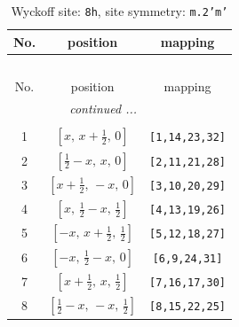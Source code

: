 \documentclass[fleqn,8pt]{jsarticle}
\begin{document}
\begin{longtable}{ccc}
\caption{Wyckoff site: {\tt 8h}, site symmetry: {\tt m.2'm'}}
 \\
 \hline \hline
No. & position & mapping \\ \hline \endfirsthead

\multicolumn{2}{l}{\tablename\ \thetable{}} \\
 \hline \hline
No. & position & mapping \\ \hline \endhead

 \hline \hline
\multicolumn{2}{r}{\footnotesize\it continued ...} \\ \endfoot

 \hline \hline
\multicolumn{2}{r}{} \\ \endlastfoot

1 & $\left[ x,\, x + \frac{1}{2},\, 0 \right]$ & {\tt [1,14,23,32]} \\ \hline
2 & $\left[ \frac{1}{2} - x,\, x,\, 0 \right]$ & {\tt [2,11,21,28]} \\ \hline
3 & $\left[ x + \frac{1}{2},\, - x,\, 0 \right]$ & {\tt [3,10,20,29]} \\ \hline
4 & $\left[ x,\, \frac{1}{2} - x,\, \frac{1}{2} \right]$ & {\tt [4,13,19,26]} \\ \hline
5 & $\left[ - x,\, x + \frac{1}{2},\, \frac{1}{2} \right]$ & {\tt [5,12,18,27]} \\ \hline
6 & $\left[ - x,\, \frac{1}{2} - x,\, 0 \right]$ & {\tt [6,9,24,31]} \\ \hline
7 & $\left[ x + \frac{1}{2},\, x,\, \frac{1}{2} \right]$ & {\tt [7,16,17,30]} \\ \hline
8 & $\left[ \frac{1}{2} - x,\, - x,\, \frac{1}{2} \right]$ & {\tt [8,15,22,25]} \\
\end{longtable}
\renewcommand{\arraystretch}{1.2}
\end{document}
